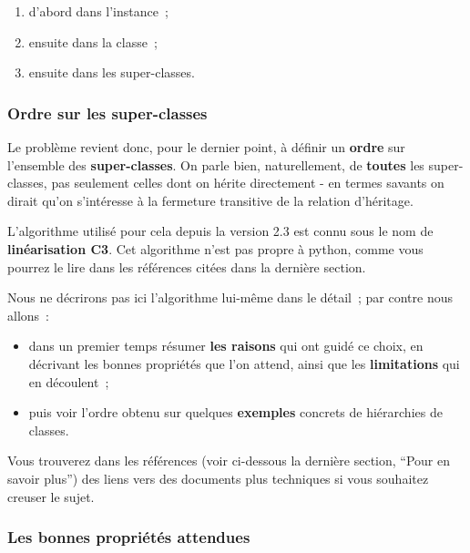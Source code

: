 \begin{enumerate}
\def\labelenumi{\arabic{enumi}.}
\tightlist
\item
  d'abord dans l'instance~;
\item
  ensuite dans la classe~;
\item
  ensuite dans les super-classes.
\end{enumerate}

    \hypertarget{ordre-sur-les-super-classes}{%
\subsubsection{Ordre sur les
super-classes}\label{ordre-sur-les-super-classes}}

    Le problème revient donc, pour le dernier point, à définir un
\textbf{ordre} sur l'ensemble des \textbf{super-classes}. On parle bien,
naturellement, de \textbf{toutes} les super-classes, pas seulement
celles dont on hérite directement - en termes savants on dirait qu'on
s'intéresse à la fermeture transitive de la relation d'héritage.

L'algorithme utilisé pour cela depuis la version 2.3 est connu sous le
nom de \textbf{linéarisation C3}. Cet algorithme n'est pas propre à
python, comme vous pourrez le lire dans les références citées dans la
dernière section.

Nous ne décrirons pas ici l'algorithme lui-même dans le détail~; par
contre nous allons~:

\begin{itemize}
\tightlist
\item
  dans un premier temps résumer \textbf{les raisons} qui ont guidé ce
  choix, en décrivant les bonnes propriétés que l'on attend, ainsi que
  les \textbf{limitations} qui en découlent~;
\item
  puis voir l'ordre obtenu sur quelques \textbf{exemples} concrets de
  hiérarchies de classes.
\end{itemize}

Vous trouverez dans les références (voir ci-dessous la dernière section,
``Pour en savoir plus'') des liens vers des documents plus techniques si
vous souhaitez creuser le sujet.

    \hypertarget{les-bonnes-propriuxe9tuxe9s-attendues}{%
\subsubsection{Les bonnes propriétés
attendues}\label{les-bonnes-propriuxe9tuxe9s-attendues}}

